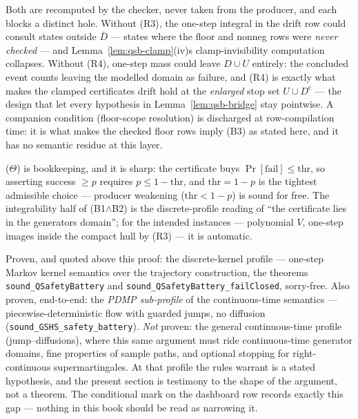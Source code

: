 \begin{bremark}
\label{rem:qsb-r34}
Both are recomputed by the checker, never taken from the producer, and
each blocks a distinct hole. Without (R3), the one-step integral in the
drift row could consult states outside $\bar{D}$ --- states where the
floor and nonneg rows were \emph{never checked} --- and
Lemma~\ref{lem:qsb-clamp}(iv)\textquotesingle s clamp-invisibility
computation collapses. Without (R4), one-step mass could leave
$D \cup U$ entirely: the concluded event counts leaving the modelled
domain as failure, and (R4) is exactly what makes the clamped
certificate\textquotesingle s drift hold at the \emph{enlarged} stop set
$U \cup D^{\mathrm{c}}$ --- the design that let every hypothesis in
Lemma~\ref{lem:qsb-bridge} stay pointwise. A companion condition
(floor-scope resolution) is discharged at row-compilation time: it is
what makes the checked floor rows imply (B3) as stated here, and it has
no semantic residue at this layer.
\end{bremark}

\begin{bremark}\label{rem:qsb-theta}
($\Theta$) is bookkeeping, and it is sharp: the certificate buys
$\Pr[\mathrm{fail}] \le \mathrm{thr}$, so asserting success
$\ge p$ requires $p \le 1 - \mathrm{thr}$, and
$\mathrm{thr} = 1 - p$ is the tightest admissible choice --- producer
weakening ($\mathrm{thr} < 1 - p$) is sound for free. The integrability
half of (B1$\wedge$B2) is the discrete-profile reading of
``the certificate lies in the generator\textquotesingle s
domain''; for the intended instances --- polynomial $V$, one-step
images inside the compact hull by (R3) --- it is automatic.
\end{bremark}

\begin{bremark}
\label{rem:qsb-profile}
Proven, and quoted above this proof: the discrete-kernel profile ---
one-step Markov kernel semantics over the trajectory construction, the
theorems \texttt{sound\_QSafetyBattery} and
\texttt{sound\_QSafetyBattery\_failClosed}, sorry-free. Also proven,
end-to-end: the \emph{PDMP sub-profile} of the continuous-time semantics
--- piecewise-deterministic flow with guarded jumps, no diffusion
(\texttt{sound\_GSHS\_safety\_battery}). \emph{Not} proven: the general
continuous-time profile (jump--diffusions), where this same argument
must ride continuous-time generator domains, fine properties of sample
paths, and optional stopping for right-continuous supermartingales. At
that profile the rule\textquotesingle s warrant is a stated hypothesis,
and the present section is testimony to the shape of the argument, not a
theorem. The conditional mark on the dashboard row records exactly this
gap --- nothing in this book should be read as narrowing it.
\end{bremark}

